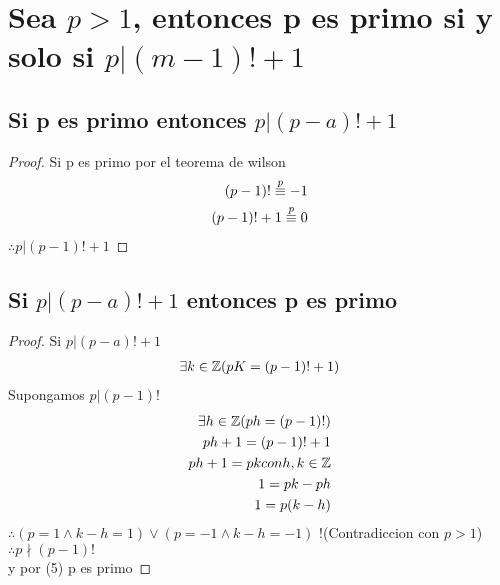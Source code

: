 \section{Sea $p>1$, entonces p es primo si y solo si $p| (m-1)! +1$}
\subsection{Si p es primo entonces  $p| (p-a)! +1$}
\begin{proof}
    Si p es primo por el teorema de wilson 
    \begin{align}
        \notag (p-1)! \stackrel{p}{\equiv} -1 \\
        \notag (p-1)!+1 \stackrel{p}{\equiv} 0
    \end{align}
     $\therefore p| (p-1)! +1 $
\end{proof}

\subsection{Si $p| (p-a)! +1$ entonces p es primo}
\begin{proof}
    Si $p| (p-a)! +1$ \\
    \begin{align}    
        \notag \exists  k \in \mathbb{Z}(pK = (p-1)! +1) \\
    \end{align}
    Supongamos $p|(p-1)!$
    \begin{align}
        \notag \exists  h \in \mathbb{Z}(ph = (p-1)!) \\
        \notag ph+1=(p-1)!+1 \\
        \notag ph+1=pk con h, k \in \mathbb{Z} \\
        \notag 1 = pk-ph \\
        \notag 1 = p(k-h)
    \end{align}
    $\therefore (p=1\land k-h =1) \lor (p=-1\land k-h =-1)$ {\huge !}(Contradiccion  con $p>1$)\\
    $\therefore p \nmid (p-1)!$\\
    y por (5) p es primo 
\end{proof}